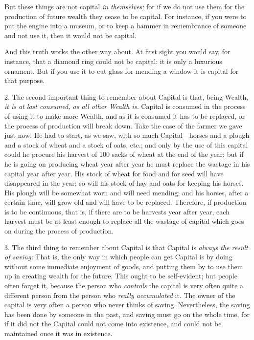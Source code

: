 \documentclass{book}
\begin{document}
But these things are not capital \emph{in themselves;} for if we do not use them for the production of future wealth they cease to be capital. For instance, if you were to put the engine into a museum, or to keep a hammer in remembrance of someone and not use it, then it would not be capital.

And this truth works the other way about. At first sight you would say, for instance, that a diamond ring could not be capital: it is only a luxurious ornament. But if you use it to cut glass for mending a window it is capital for that purpose.

2. The second important thing to remember about Capital is that, being Wealth, \emph{it is at last consumed, as all other Wealth is.} Capital is consumed in the process of using it to make more Wealth, and as it is consumed it has to be replaced, or the process of production will break down. Take the case of the farmer we gave just now. He had to start, as we saw, with so much Capital—horses and a plough and a stock of wheat and a stock of oats, etc.; and only by the use of this capital could he procure his harvest of 100 sacks of wheat at the end of the year; but if he is going on producing wheat year after year he must replace the wastage in his capital year after year. His stock of wheat for food and for seed will have disappeared in the year; so will his stock of hay and oats for keeping his horses. His plough will be somewhat worn and will need mending; and his horses, after a certain time, will grow old and will have to be replaced. Therefore, if production is to be continuous, that is, if there are to be harvests year after year, each harvest must be at least enough to replace all the wastage of capital which goes on during the process of production.

3. The third thing to remember about Capital is that Capital is \emph{always the result of saving:} That is, the only way in which people can get Capital is by doing without some immediate enjoyment of goods, and putting them by to use them up in creating wealth for the future. This ought to be self-evident; but people often forget it, because the person who \emph{controls} the capital is very often quite a different person from the person who \emph{really accumulated} it. The owner of the capital is very often a person who never thinks of saving. Nevertheless, the saving has been done by someone in the past, and saving must go on the whole time, for if it did not the Capital could not come into existence, and could not be maintained once it was in existence.
\end{document}
